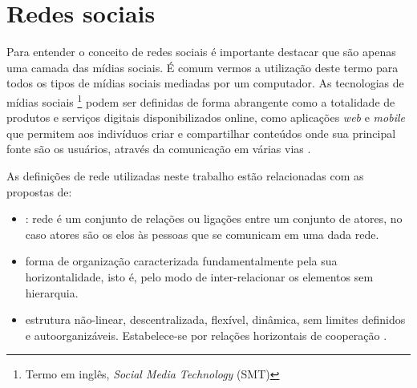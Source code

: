 %
%
%
\section{Redes sociais}
\label{rede-social}

Para entender o conceito de redes sociais é importante destacar que são apenas uma camada das mídias sociais. É comum vermos a utilização deste termo para todos os tipos de mídias sociais mediadas por um computador. As tecnologias de mídias sociais \footnote{Termo em inglês, \textit{Social Media Technology} (SMT)} podem ser definidas de forma abrangente como a totalidade de produtos e serviços digitais disponibilizados online, como aplicações \textit{web} e \textit{mobile} que permitem aos indivíduos criar e compartilhar conteúdos onde sua principal fonte são os usuários, através da comunicação em várias vias \cite{davis2012social}.

As definições de rede utilizadas neste trabalho estão relacionadas com as propostas de:

\begin{itemize}
\item {}: rede é um conjunto de relações ou ligações entre um conjunto de atores, no caso atores são os elos às pessoas que se comunicam em uma dada rede.

\item {} forma de organização caracterizada fundamentalmente pela sua horizontalidade, isto é, pelo modo de inter-relacionar os elementos sem hierarquia.

\item {} estrutura não-linear, descentralizada, flexível, dinâmica, sem limites definidos e autoorganizáveis. Estabelece-se por relações horizontais de cooperação .

\end{itemize}


